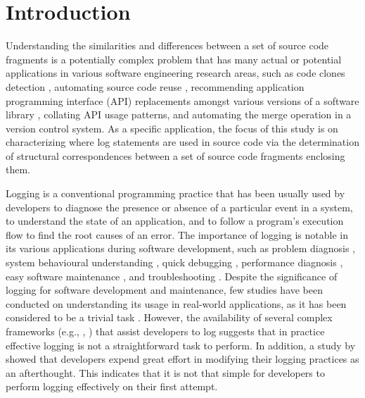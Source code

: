 \chapter{Introduction}  \label{Introduction}
 
Understanding the similarities and differences between a set of source code fragments is a potentially complex problem that has many actual or potential applications in various software engineering research areas, such as code clones detection \cite{bulychev2009evaluation}, automating source code reuse \cite{2008:fse:cottrell}, recommending application programming interface (API) replacements amongst various versions of a software library \cite{2014:uofc:cossette}, collating API usage patterns, and automating the merge operation in a version control system. As a specific application, the focus of this study is on characterizing where log statements are used in source code via the determination of structural correspondences between a set of source code fragments enclosing them.


Logging is a conventional programming practice that has been usually used by developers to diagnose the presence or absence of a particular event in a system, to understand the state of an application, and to follow a program's execution flow to find the root causes of an error. The importance of logging is notable in its various applications during software development, such as problem diagnosis \cite{lou2010mining}, system behavioural understanding \cite{fu2013contextual}, quick debugging \cite{gupta2005pro}, performance diagnosis \cite{nagaraj2012structured}, easy software maintenance \cite{gupta2005pro}, and troubleshooting \cite{fu2009execution}. Despite the significance of logging for software development and maintenance, few studies have been conducted on understanding its usage in real-world applications, as it has been considered to be a trivial task \cite{clarke1999dimension,clarke1999subject}. However, the availability of several complex frameworks (e.g., , ) that assist developers to log suggests that in practice effective logging is not a straightforward task to perform. In addition, a study by \citet{yuan2012characterizing} showed that developers expend great effort in modifying their logging practices as an afterthought. This indicates that it is not that simple for developers to perform logging effectively on their first attempt. 

